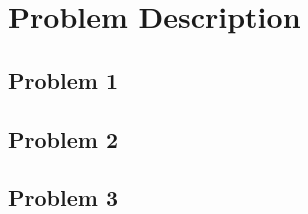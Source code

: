 
\chapter{Problem Description} \label{chap:problem-description}

\bt

\section{Problem 1}

\bt

\section{Problem 2}

\bt 

\section{Problem 3}


